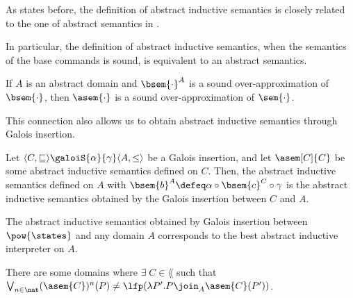 As states before, the definition of abstract inductive semantics is closely
related to the one of abstract semantics in \cite{Cousot77}.

In particular, the definition of abstract inductive semantics, when the 
semantics of the base commands is sound, is equivalent to an abstract semantics.


\begin{theorem}
  \label{thm:sound-ai}
  If $A$ is an abstract domain and $\bsem{\cdot}^A$ is a sound 
  over-approximation of $\bsem{\cdot}$, then $\asem{\cdot}$ is a sound 
  over-approximation of $\sem{\cdot}$.
\end{theorem}

This connection also allows us to obtain abstract inductive semantics through 
Galois insertion.

\begin{definition}
  \label{def:aisgi}
  Let $\langle C, \sqsubseteq \rangle \galoiS{\alpha}{\gamma} \langle A, \leq 
  \rangle$ be a Galois insertion, and let $\asem[C]{C}$ be some abstract 
  inductive semantics defined on $C$. Then, the abstract inductive semantics 
  defined on $A$ with $\bsem{b}^A \defeq \alpha \circ \bsem{c}^C \circ \gamma$ is the 
  abstract inductive semantics obtained by the Galois insertion between $C$ and $A$.
\end{definition}

The abstract inductive semantics obtained by Galois insertion between 
$\pow{\states}$ and any domain $A$ corresponds to the best abstract inductive 
interpreter on $A$.

\begin{observation}
  \label{obs:abstract-fix}
  There are some domains where $\exists \; C \in \lang$ such that
  $\bigvee_{n \in \nat} (\asem{C})^n(P) \neq \lfp(\lambda P'. P \join_A
  \asem{C}(P'))$.
\end{observation}
